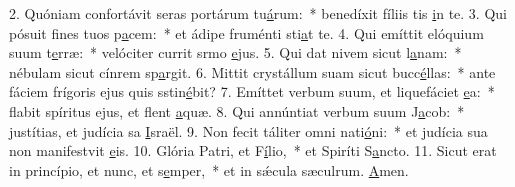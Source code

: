2. Quóniam confortávit seras portárum tu\uline{á}rum:~* benedíxit fíliis tis \uline{i}n te.
3. Qui pósuit fines tuos p\uline{a}cem:~* et ádipe fruménti sti\uline{a}t te.
4. Qui emíttit elóquium suum t\uline{e}rræ:~* velóciter currit srmo \uline{e}jus.
5. Qui dat nivem sicut l\uline{a}nam:~* nébulam sicut cínrem sp\uline{a}rgit.
6. Mittit crystállum suam sicut bucc\uline{é}llas:~* ante fáciem frígoris ejus quis sstin\uline{é}bit?
7. Emíttet verbum suum, et liquefáciet \uline{e}a:~* flabit spíritus ejus, et flent \uline{a}quæ.
8. Qui annúntiat verbum suum J\uline{a}cob:~* justítias, et judícia sa \uline{I}sraël.
9. Non fecit táliter omni nati\uline{ó}ni:~* et judícia sua non manifestvit \uline{e}is.
10. Glória Patri, et F\uline{í}lio,~* et Spiríti S\uline{a}ncto.
11. Sicut erat in princípio, et nunc, et s\uline{e}mper,~* et in sǽcula sæculrum. \uline{A}men.
